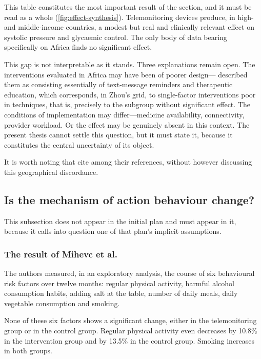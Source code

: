 \documentclass[12pt,a4paper,oneside]{report}
\begin{document}
This table constitutes the most important result of the section, and it must be read as a whole (\cref{fig:effect-synthesis}). Telemonitoring devices produce, in high- and middle-income countries, a modest but real and clinically relevant effect on systolic pressure and glycaemic control. The only body of data bearing specifically on Africa finds no significant effect.

This gap is not interpretable as it stands. Three explanations remain open. The interventions evaluated in Africa may have been of poorer design---\textcite{stokes2022} described them as consisting essentially of text-message reminders and therapeutic education, which corresponds, in Zhou's grid, to single-factor interventions poor in techniques, that is, precisely to the subgroup without significant effect. The conditions of implementation may differ---medicine availability, connectivity, provider workload. Or the effect may be genuinely absent in this context. The present thesis cannot settle this question, but it must state it, because it constitutes the central uncertainty of its object.

It is worth noting that \textcite{zhou2024} cite \textcite{aovare2023} among their references, without however discussing this geographical discordance.

\subsection{Is the mechanism of action behaviour change?}\label{sec:mechanism}

This subsection does not appear in the initial plan and must appear in it, because it calls into question one of that plan's implicit assumptions.

\subsubsection{The result of Mihevc et al.}

The authors measured, in an exploratory analysis, the course of six behavioural risk factors over twelve months: regular physical activity, harmful alcohol consumption habits, adding salt at the table, number of daily meals, daily vegetable consumption and smoking.

None of these six factors shows a significant change, either in the telemonitoring group or in the control group. Regular physical activity even decreases by 10.8\% in the intervention group and by 13.5\% in the control group. Smoking increases in both groups.
\end{document}
